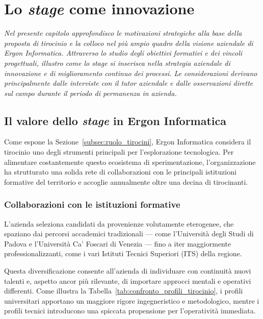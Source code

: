 \chapter{Lo \textit{stage} come innovazione}
\label{chap:strategia}

\textit{Nel presente capitolo approfondisco le motivazioni strategiche alla base della proposta di tirocinio e la colloco nel più ampio quadro della visione aziendale di Ergon Informatica. Attraverso lo studio degli obiettivi formativi e dei vincoli progettuali, illustro come lo \emph{stage} si inserisca nella strategia aziendale di innovazione e di miglioramento continuo dei processi. Le considerazioni derivano principalmente dalle interviste con il \emph{tutor} aziendale e dalle osservazioni dirette sul campo durante il periodo di permanenza in azienda.}

\section{Il valore dello \textit{stage} in Ergon Informatica}
\label{sec:valore_stage}

Come espone la Sezione~\ref{subsec:ruolo_tirocini}, Ergon Informatica considera il tirocinio uno degli strumenti principali per l'esplorazione tecnologica. Per alimentare costantemente questo ecosistema di sperimentazione, l'organizzazione ha strutturato una solida rete di collaborazioni con le principali istituzioni formative del territorio e accoglie annualmente oltre una decina di tirocinanti. 

\subsection{Collaborazioni con le istituzioni formative}
\label{subsec:collaborazioni_formative}

L'azienda seleziona candidati da provenienze volutamente eterogenee, che spaziano dai percorsi accademici tradizionali --- come l'Università degli Studi di Padova e l'Università Ca' Foscari di Venezia --- fino a iter maggiormente professionalizzanti, come i vari Istituti Tecnici Superiori (ITS) della regione. 

Questa diversificazione consente all'azienda di individuare con continuità nuovi talenti e, aspetto ancor più rilevante, di importare approcci mentali e operativi differenti. Come illustra la Tabella~\ref{tab:confronto_profili_tirocinio}, i profili universitari apportano un maggiore rigore ingegneristico e metodologico, mentre i profili tecnici introducono una spiccata propensione per l'operatività immediata. 

